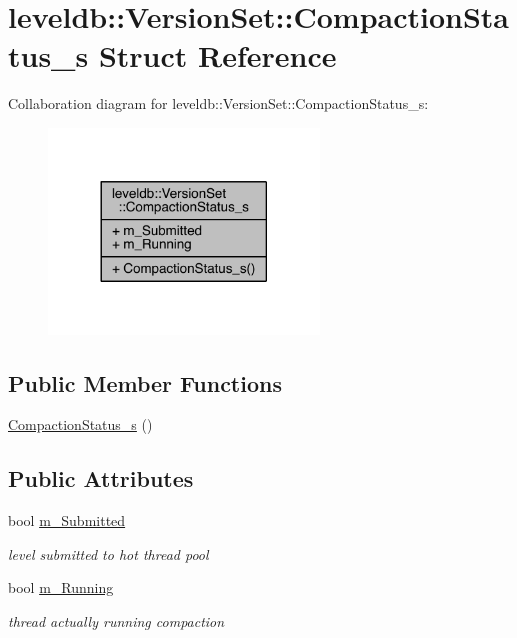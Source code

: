 \hypertarget{structleveldb_1_1_version_set_1_1_compaction_status__s}{}\section{leveldb\+:\+:Version\+Set\+:\+:Compaction\+Status\+\_\+s Struct Reference}
\label{structleveldb_1_1_version_set_1_1_compaction_status__s}


Collaboration diagram for leveldb\+:\+:Version\+Set\+:\+:Compaction\+Status\+\_\+s\+:\nopagebreak
\begin{figure}[H]
\begin{center}
\leavevmode
\includegraphics[width=204pt]{structleveldb_1_1_version_set_1_1_compaction_status__s__coll__graph}
\end{center}
\end{figure}
\subsection*{Public Member Functions}
\begin{DoxyCompactItemize}
\item 
\hyperlink{structleveldb_1_1_version_set_1_1_compaction_status__s_a6ef82e7ae3f91abdd2c06c5e05276621}{Compaction\+Status\+\_\+s} ()
\end{DoxyCompactItemize}
\subsection*{Public Attributes}
\begin{DoxyCompactItemize}
\item 
bool \hyperlink{structleveldb_1_1_version_set_1_1_compaction_status__s_a65911d1ca6b5a49cde2ce0b79908523d}{m\+\_\+\+Submitted}
\begin{DoxyCompactList}\small\item\em level submitted to hot thread pool \end{DoxyCompactList}\item 
bool \hyperlink{structleveldb_1_1_version_set_1_1_compaction_status__s_aaebe4c32955158a785b254fff289c31d}{m\+\_\+\+Running}
\begin{DoxyCompactList}\small\item\em thread actually running compaction \end{DoxyCompactList}\end{DoxyCompactItemize}


